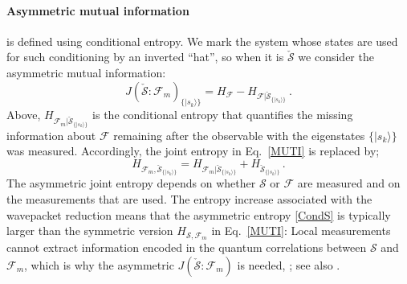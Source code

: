 \documentclass[aps,prl,showpacs,amsmath,amssymb,amsfonts,lengthcheck,twocolumn,longbibliography,superscriptaddress]{revtex4-2}
\newcommand{\ket}[1]    {| #1 \rangle}
\newcommand{\cS}        {{\mathcal S}}
\newcommand{\+}         {\dagger}
\newcommand\cF{{\mathcal F}}
\newcommand{\mc}[1]{\mathcal{#1}}
\begin{document}
\paragraph*{Asymmetric mutual information} 
is defined using conditional entropy. We mark the system whose states are used for such conditioning by an inverted ``hat'', so when it is $\check{\mc{S}}$ we consider the asymmetric mutual information:
\begin{equation}
J(\check \cS : \mc{F}_m)_{\{ \ket {s_k} \}}  = H_{\cF} - H_{{\cF}|\check \cS_{\{ \ket {s_k} \}}} \ .
\label{Asmutinfo}
\end{equation}
Above, $H_{{\cF_m} | {\check \cS_{\{ \ket {s_k} \}}}}$  is the conditional entropy \cite{nielsen2002quantum} that quantifies the missing information about $\cF$ remaining after the observable with the eigenstates $\{ \ket {s_k} \}$ was measured. Accordingly, the joint entropy in Eq.~\eqref{MUTI} is replaced by;
\begin{equation}
H_{{\cF_m}, \check \cS_{\{ \ket {s_k}\}}}= H_{{\cF_m} | {\check \cS_{\{ \ket {s_k} \}}}} + H_{\check \cS_{\{ \ket {s_k}\}}}\,.
\label{CondS}
\end{equation}
The asymmetric joint entropy  depends on whether $\cS$ or $\cF$ are measured and on the measurements that are used. The entropy increase associated with the wavepacket reduction means that the asymmetric entropy \eqref{CondS} is typically larger than the symmetric version $H_{\cS, {\cF_m}} $ in Eq.~\eqref{MUTI}: Local measurements cannot extract information encoded in the quantum correlations between $\mc{S}$ and $\mc{F}_m$, which is why the asymmetric $J(\check \cS : \mc{F}_m)$ is needed, \cite{nielsen2002quantum}; see also \cite{touil2021quantum}. 
\end{document}
